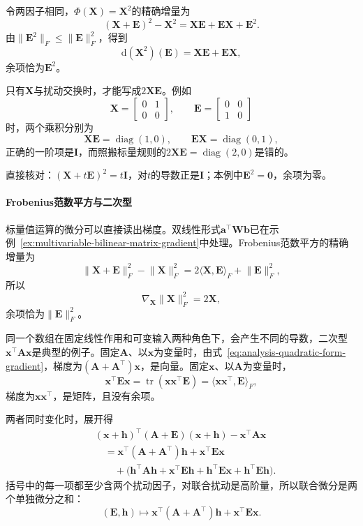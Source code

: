 令两因子相同，$\Phi(\bm X)=\bm X^2$的精确增量为
\[
 (\bm X+\bm E)^2-\bm X^2=\bm X\bm E+\bm E\bm X+\bm E^2.
\]
由$\lVert\bm E^2\rVert_F\leq\lVert\bm E\rVert_F^2$，得到
\begin{equation}
 \mathrm d(\bm X^2)(\bm E)=\bm X\bm E+\bm E\bm X,
\label{eq:multivariable-matrix-square-differential}
\end{equation}
余项恰为$\bm E^2$。

只有$\bm X$与扰动交换时，才能写成$2\bm X\bm E$。例如
\[
 \bm X=\begin{bmatrix}0&1\\0&0\end{bmatrix},\qquad
 \bm E=\begin{bmatrix}0&0\\1&0\end{bmatrix}
\]
时，两个乘积分别为
\[
 \bm X\bm E=\operatorname{diag}(1,0),\qquad\bm E\bm X=\operatorname{diag}(0,1),
\]
正确的一阶项是$\bm I$，而照搬标量规则的$2\bm X\bm E=\operatorname{diag}(2,0)$是错的。

直接核对：$(\bm X+t\bm E)^2=t\bm I$，对$t$的导数正是$\bm I$；本例中$\bm E^2=\bm 0$，余项为零。

\paragraph{Frobenius范数平方与二次型}
标量值运算的微分可以直接读出梯度。双线性形式$\bm a^\top\bm W\bm b$已在示例~\ref{ex:multivariable-bilinear-matrix-gradient}中处理。Frobenius范数平方的精确增量为
\[
 \lVert\bm X+\bm E\rVert_F^2-\lVert\bm X\rVert_F^2=2\langle\bm X,\bm E\rangle_F+\lVert\bm E\rVert_F^2 ,
\]
所以
\[
 \nabla_{\bm X}\lVert\bm X\rVert_F^2=2\bm X,
\]
余项恰为$\lVert\bm E\rVert_F^2$。

同一个数组在固定线性作用和可变输入两种角色下，会产生不同的导数，二次型$\bm x^\top\bm A\bm x$是典型的例子。固定$\bm A$、以$\bm x$为变量时，由式~\eqref{eq:analysis-quadratic-form-gradient}，梯度为$(\bm A+\bm A^\top)\bm x$，是向量。固定$\bm x$、以$\bm A$为变量时，
\[
 \bm x^\top\bm E\bm x=\operatorname{tr}(\bm x\bm x^\top\bm E)=\langle\bm x\bm x^\top,\bm E\rangle_F,
\]
梯度为$\bm x\bm x^\top$，是矩阵，且没有余项。

两者同时变化时，展开得
\[
 \begin{aligned}
 &(\bm x+\bm h)^\top(\bm A+\bm E)(\bm x+\bm h)-\bm x^\top\bm A\bm x\\
 &\quad=\bm x^\top(\bm A+\bm A^\top)\bm h+\bm x^\top\bm E\bm x\\
 &\qquad+\bigl(\bm h^\top\bm A\bm h+\bm x^\top\bm E\bm h+\bm h^\top\bm E\bm x+\bm h^\top\bm E\bm h\bigr).
 \end{aligned}
\]
括号中的每一项都至少含两个扰动因子，对联合扰动是高阶量，所以联合微分是两个单独微分之和：
\[
 (\bm E,\bm h)\mapsto\bm x^\top(\bm A+\bm A^\top)\bm h+\bm x^\top\bm E\bm x.
\]

